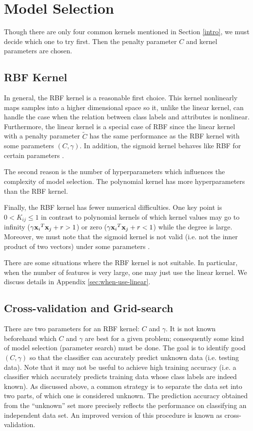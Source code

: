 \documentclass[12pt]{article}
\def\bx{{\bf x}}
\begin{document}
\section{Model Selection}
Though there are only four common kernels mentioned in Section
\ref{intro}, we must decide which one to try first. Then the penalty
parameter $C$ and kernel parameters are chosen.

\subsection{RBF Kernel}
\label{sec:rbf-kernel}
In general, the RBF kernel is a reasonable first choice.  This kernel
nonlinearly maps samples into a higher dimensional space so it,
unlike the linear kernel, can handle the case when the relation
between class labels and attributes is nonlinear. Furthermore, the
linear kernel is a special case of RBF \cite{SSK02b} since the linear
kernel with a penalty parameter $\tilde{C}$ has the same performance
as the RBF kernel with some parameters $(C, \gamma)$. In addition, the
sigmoid kernel behaves like RBF for certain parameters \citep{HTL03a}.

The second reason is the number of hyperparameters which influences
the complexity of model selection.  The polynomial kernel has more
hyperparameters than the RBF kernel.

Finally, the RBF kernel has fewer numerical difficulties.  One key
point is $0 < K_{ij} \leq 1$ in contrast to polynomial kernels of
which kernel values may go to infinity ($\gamma {\bx_i}^T \bx_j + r >
1$) or zero ($\gamma {\bx_i}^T \bx_j + r < 1$) while the degree is
large.  Moreover, we must note that the sigmoid kernel is not valid
(i.e. not the inner product of two vectors) under some parameters
\citep{VV95a}.


There are some situations where the RBF kernel is not
suitable. In particular, when the number of features is very large,
one may just use the linear kernel. We discuss details in Appendix
\ref{sec:when-use-linear}.

\subsection{Cross-validation and Grid-search}
\label{cross}
There are two parameters for an RBF kernel: $C$ and $\gamma$.  It is
not known beforehand which $C$ and $\gamma$ are best for a given
problem; consequently some kind of model selection (parameter search)
must be done. The goal is to identify good $(C, \gamma)$ so that the
classifier can accurately predict unknown data (i.e. testing data).
Note that it may not be useful to achieve high training accuracy
(i.e. a classifier which accurately predicts training data whose class
labels are indeed known). As discussed above, a common strategy is to
separate the data set into two parts, of which one is considered
unknown. The prediction accuracy obtained from the ``unknown'' set more
precisely reflects the performance on classifying an independent data
set. An improved version of this procedure is known as cross-validation.
\end{document}
